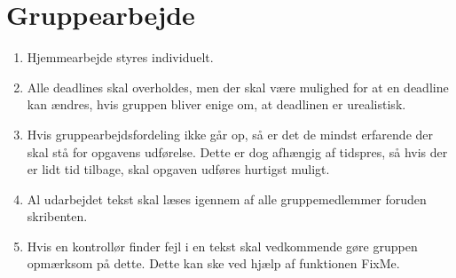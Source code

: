 \section{Gruppearbejde}
\begin{enumerate}
\item{Hjemmearbejde styres individuelt.}
\item{Alle deadlines skal overholdes, men der skal være mulighed for at en deadline kan ændres, hvis gruppen bliver enige om, at deadlinen er urealistisk.}
\item{Hvis gruppearbejdsfordeling ikke går op, så er det de mindst erfarende der skal stå for opgavens udførelse. Dette er dog afhængig af tidspres, så hvis der er lidt tid tilbage, skal opgaven udføres hurtigst muligt. }
\item Al udarbejdet tekst skal læses igennem af alle gruppemedlemmer foruden skribenten.
\item{Hvis en kontrollør finder  fejl i en tekst skal vedkommende gøre gruppen opmærksom på
dette. Dette kan ske ved hjælp af funktionen FixMe.}
\end{enumerate}

